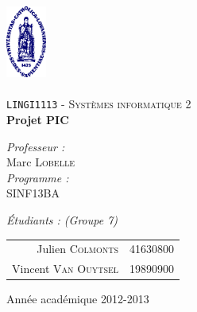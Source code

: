 \begin{titlepage}
 
\begin{center}
 
\vspace*{-2cm}\includegraphics[width=0.10\textwidth]{ucl.png}\\[1cm]
 
\textsc{\LARGE }\\[1.5cm]
 
\textsc{\Large \texttt{LINGI1113} - Systèmes informatique 2}\\[0.5cm]
 
 
\vspace{1.0cm}
{ \huge \bfseries Projet PIC\vspace{0.8cm}\\}
 
\vspace{1.0cm}
 
\begin{minipage}{0.4\textwidth}
\begin{flushleft} \large
\emph{Professeur :}\\
	Marc \textsc{Lobelle}\\
\vspace{1cm}
\emph{Programme :}\\
	SINF13BA
\end{flushleft}
\end{minipage}
\begin{minipage}{0.4\textwidth}
\begin{flushright} \large
\emph{Étudiants : (Groupe 7)} \\
\begin{tabular}{rl}
	Julien \textsc{Colmonts}	& {\footnotesize 41630800}\\
	Vincent \textsc{Van Ouytsel}	& {\footnotesize 19890900}
\end{tabular}
\end{flushright}
\end{minipage}
 
\vfill
 
\vspace{1.1cm}
{\large Année académique 2012-2013}
\vspace{-1cm} 
\end{center}
 
\end{titlepage}

